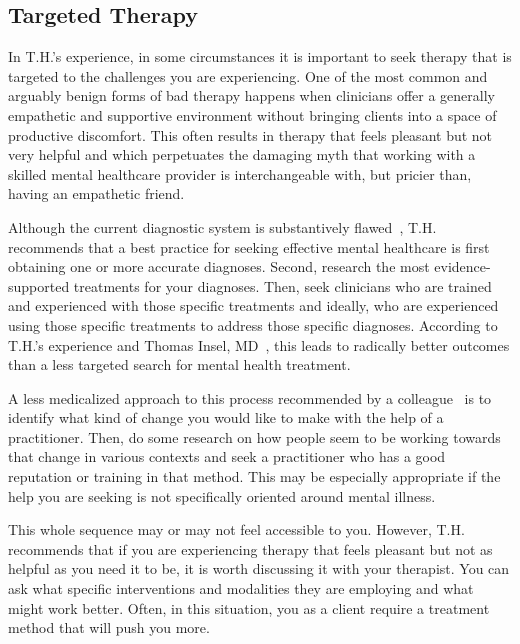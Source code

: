 \documentclass[11pt,oneside]{book}
\let\cite\parencite
\begin{document}
\subsection*{Targeted Therapy}
In T.H.'s experience, in some circumstances it is important to seek therapy that is targeted to the challenges you are experiencing. One of the most common and arguably benign forms of bad therapy happens when clinicians offer a generally empathetic and supportive environment without bringing clients into a space of productive discomfort. This often results in therapy that feels pleasant but not very helpful and which perpetuates the damaging myth that working with a skilled mental healthcare provider is interchangeable with, but pricier than, having an empathetic friend.

Although the current diagnostic system is substantively flawed~\cite{cohen2023need,eaton2023review}, T.H. recommends that a best practice for seeking effective mental healthcare is first obtaining one or more accurate diagnoses. Second, research the most evidence-supported treatments for your diagnoses. Then, seek clinicians who are trained and experienced with those specific treatments and ideally, who are experienced using those specific treatments to address those specific diagnoses. According to T.H.'s experience and Thomas Insel, MD~\cite{eksIncel}, this leads to radically better outcomes than a less targeted search for mental health treatment.

A less medicalized approach to this process recommended by a colleague~\cite{sinback} is to identify what kind of change you would like to make with the help of a practitioner. Then, do some research on how people seem to be working towards that change in various contexts and seek a practitioner who has a good reputation or training in that method. This may be especially appropriate if the help you are seeking is not specifically oriented around mental illness.

This whole sequence may or may not feel accessible to you. However, T.H. recommends that if you are experiencing therapy that feels pleasant but not as helpful as you need it to be, it is worth discussing it with your therapist. You can ask what specific interventions and modalities they are employing and what might work better. Often, in this situation, you as a client require a treatment method that will push you more.
\end{document}
